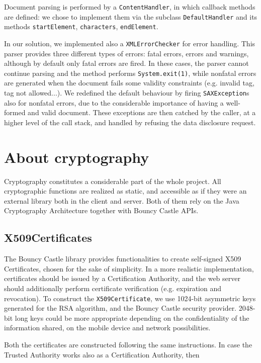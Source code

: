 Document parsing is performed by a \texttt{ContentHandler}, in which callback methods are defined: we chose to implement them via the subclass \texttt{DefaultHandler} and its methods \texttt{startElement}, \texttt{characters}, \texttt{endElement}.

In our solution, we implemented also a \texttt{XMLErrorChecker} for error handling. This parser provides three different types of errors: fatal errors, errors and warnings, although by default only fatal errors are fired. In these cases, the parser cannot continue parsing and the method performs \texttt{System.exit(1)}, while nonfatal errors are generated when the document fails some validity constraints (e.g. invalid tag, tag not allowed...). We redefined the default behaviour by firing \texttt{SAXException}s also for nonfatal errors, due to the considerable importance of having a well-formed and valid document. These exceptions are then catched by the caller, at a higher level of the call stack, and handled by refusing the data disclosure request.


\section{About cryptography}
Cryptography constitutes a considerable part of the whole project. All cryptographic functions are realized as static, and accessible as if they were an external library both in the client and server. Both of them rely on the Java Cryptography Architecture together with Bouncy Castle APIs.

\subsection{X509Certificates}
The Bouncy Castle library provides functionalities to create self-signed X509 Certificates, chosen for the sake of simplicity. In a more realistic implementation, certificates should be issued by a Certification Authority, and the web server should additionally perform certificate verification (e.g. expiration and revocation). To construct the \texttt{X509Certificate}, we use 1024-bit asymmetric keys generated for the RSA algorithm, and the Bouncy Castle security provider. 2048-bit long keys could be more appropriate depending on the confidentiality of the information shared, on the mobile device and network possibilities.

Both the certificates are constructed following the same instructions. In case the Trusted Authority works also as a Certification Authority, then 

